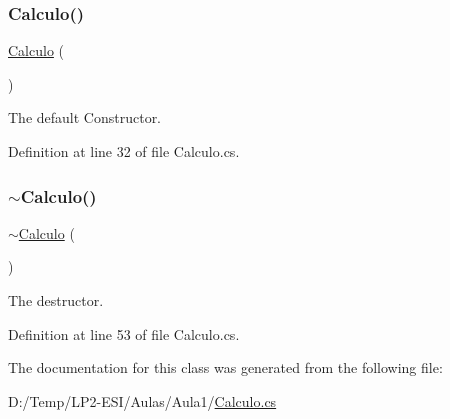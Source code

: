 \subsubsection{\texorpdfstring{Calculo()}{Calculo()}}
{\footnotesize\ttfamily \mbox{\hyperlink{classAula1_1_1Calculo}{Calculo}} (\begin{DoxyParamCaption}{ }\end{DoxyParamCaption})}



The default Constructor. 



Definition at line 32 of file Calculo.\+cs.

\mbox{\label{classAula1_1_1Calculo_a2e0ec1e880e01bc6df0c6210773ab2ce}} 
\subsubsection{\texorpdfstring{$\sim$Calculo()}{~Calculo()}}
{\footnotesize\ttfamily $\sim$\mbox{\hyperlink{classAula1_1_1Calculo}{Calculo}} (\begin{DoxyParamCaption}{ }\end{DoxyParamCaption})\hspace{0.3cm}{\ttfamily [private]}}



The destructor. 



Definition at line 53 of file Calculo.\+cs.



The documentation for this class was generated from the following file\+:\begin{DoxyCompactItemize}
\item 
D\+:/\+Temp/\+L\+P2-\/\+E\+S\+I/\+Aulas/\+Aula1/\mbox{\hyperlink{Calculo_8cs}{Calculo.\+cs}}\end{DoxyCompactItemize}
